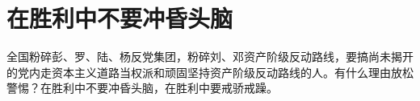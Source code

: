 \section[在胜利中不要冲昏头脑（一九六七年三月）]{在胜利中不要冲昏头脑}


全国粉碎彭、罗、陆、杨反党集团，粉碎刘、邓资产阶级反动路线，要搞尚未揭开的党内走资本主义道路当权派和顽固坚持资产阶级反动路线的人。有什么理由放松警惕？在胜利中不要冲昏头脑，在胜利中要戒骄戒躁。

